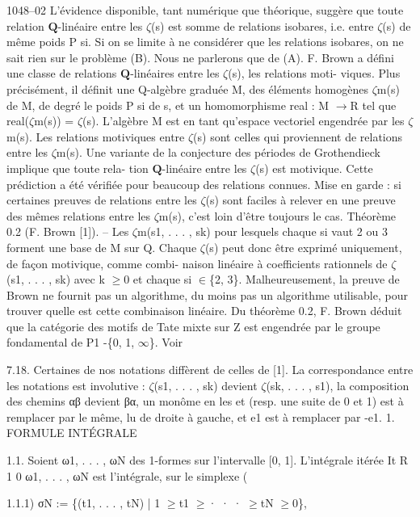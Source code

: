 \documentclass[11pt]{article}
\begin{document}
1048--02 L’évidence disponible, tant numérique que théorique, suggère que toute relation \(\mathbf Q\)-linéaire entre les \(\zeta\)(s) est somme de relations isobares, i.e. entre \(\zeta\)(s) de même poids P si. Si on se limite à ne considérer que les relations isobares, on ne sait rien sur le problème (B). Nous ne parlerons que de (A). F. Brown a défini une classe de relations \(\mathbf Q\)-linéaires entre les \(\zeta\)(s), les relations moti- viques. Plus précisément, il définit une Q-algèbre graduée M, des éléments homogènes \(\zeta\)m(s) de M, de degré le poids P si de s, et un homomorphisme real : M \(\to\)R tel que real(\(\zeta\)m(s)) = \(\zeta\)(s). L’algèbre M est en tant qu’espace vectoriel engendrée par les \(\zeta\)m(s). Les relations motiviques entre \(\zeta\)(s) sont celles qui proviennent de relations entre les \(\zeta\)m(s). Une variante de la conjecture des périodes de Grothendieck implique que toute rela- tion \(\mathbf Q\)-linéaire entre les \(\zeta\)(s) est motivique. Cette prédiction a été vérifiée pour beaucoup des relations connues. Mise en garde : si certaines preuves de relations entre les \(\zeta\)(s) sont faciles à relever en une preuve des mêmes relations entre les \(\zeta\)m(s), c’est loin d’être toujours le cas. Théorème 0.2 (F. Brown [1]). -- Les \(\zeta\)m(s1, . . . , sk) pour lesquels chaque si vaut 2 ou 3 forment une base de M sur Q. Chaque \(\zeta\)(s) peut donc être exprimé uniquement, de façon motivique, comme combi- naison linéaire à coefficients rationnels de \(\zeta\)(s1, . . . , sk) avec k \(\ge\)0 et chaque si \(\in\)\{2, 3\}. Malheureusement, la preuve de Brown ne fournit pas un algorithme, du moins pas un algorithme utilisable, pour trouver quelle est cette combinaison linéaire. Du théorème 0.2, F. Brown déduit que la catégorie des motifs de Tate mixte sur Z est engendrée par le groupe fondamental de P1 -\{0, 1, \(\infty\)\}. Voir 

7.18. Certaines de nos notations diffèrent de celles de [1]. La correspondance entre les notations est involutive : \(\zeta\)(s1, . . . , sk) devient \(\zeta\)(sk, . . . , s1), la composition des chemins αβ devient βα, un monôme en les et (resp. une suite de 0 et 1) est à remplacer par le même, lu de droite à gauche, et e1 est à remplacer par -e1. 1. FORMULE INTÉGRALE 

1.1. Soient ω1, . . . , ωN des 1-formes sur l’intervalle [0, 1]. L’intégrale itérée It R 1 0 ω1, . . . , ωN est l’intégrale, sur le simplexe (

1.1.1) σN := \{(t1, . . . , tN) | 1 \(\ge\)t1 \(\ge\)· · · \(\ge\)tN \(\ge\)0\},
\end{document}
